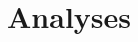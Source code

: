 \documentclass[a4paper,num-refs]{oup-contemporary}
\begin{document}
\section{Analyses}


\end{document}
